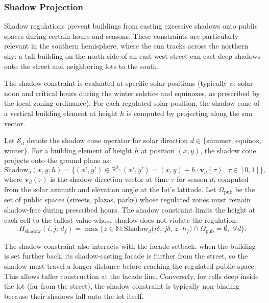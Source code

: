 \documentclass[11pt,a4paper]{article}
\newcommand{\R}{\mathbb{R}}
\newcommand{\N}{\mathbb{N}}
\newcommand{\calS}{\mathcal{S}}
\begin{document}
\subsubsection{Shadow Projection}

Shadow regulations prevent buildings from casting excessive shadows onto
public spaces during certain hours and seasons. These constraints are
particularly relevant in the southern hemisphere, where the sun tracks
across the northern sky: a tall building on the north side of an
east-west street can cast deep shadows onto the street and neighboring
lots to the south.

The shadow constraint is evaluated at specific solar positions (typically
at solar noon and critical hours during the winter solstice and
equinoxes, as prescribed by the local zoning ordinance). For each
regulated solar position, the shadow cone of a vertical building element
at height $h$ is computed by projecting along the sun vector.

Let $\calS_d$ denote the shadow cone operator for solar direction $d \in
\{$summer, equinox, winter$\}$. For a building element of height $h$ at
position $(x,y)$, the shadow cone projects onto the ground plane as:
\begin{equation}
    \text{Shadow}_d(x,y,h) = \bigl\{(x',y') \in \R^2 : (x',y') = (x,y) + h \cdot \mathbf{v}_d(\tau),\; \tau \in [0,1]\bigr\},
\end{equation}
where $\mathbf{v}_d(\tau)$ is the shadow direction vector at time $\tau$
for season $d$, computed from the solar azimuth and elevation angle at
the lot's latitude. Let $\Omega_{\text{pub}}$ be the set of public spaces
(streets, plazas, parks) whose regulated zones must remain shadow-free
during prescribed hours. The shadow constraint limits the height at each
cell to the tallest value whose shadow does not violate the regulation:
\begin{equation}
    H_{\text{shadow}}(i,j;\,d_f) = \max\bigl\{z \in \N : \text{Shadow}_d\bigl(i\delta,\,j\delta,\,z \cdot h_f\bigr) \cap \Omega_{\text{pub}} = \emptyset,\; \forall d\bigr\}.
\end{equation}

The shadow constraint also interacts with the facade setback: when the
building is set further back, its shadow-casting facade is further from
the street, so the shadow must travel a longer distance before reaching
the regulated public space. This allows taller construction at the
facade line. Conversely, for cells deep inside the lot (far from the
street), the shadow constraint is typically non-binding because their
shadows fall onto the lot itself.
\end{document}

